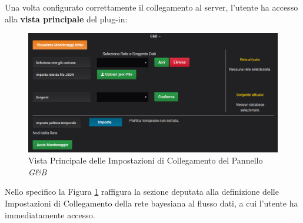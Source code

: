Una volta configurato correttamente il collegamento al server, l'utente ha accesso alla \textbf{vista principale} del plug-in:
\begin{figure}[H]
	\begin{center}
		\includegraphics[scale=0.64]{./images/Panel.png}
		 \caption{Vista Principale delle Impostazioni di Collegamento del Pannello \textit{G\&B}}	
		 \label{Pannello}
	\end{center}
\end{figure}

Nello specifico la Figura \ref{Pannello} raffigura la sezione deputata alla definizione delle Impostazioni di Collegamento della rete bayesiana al flusso dati, a cui l'utente ha immediatamente accesso.
